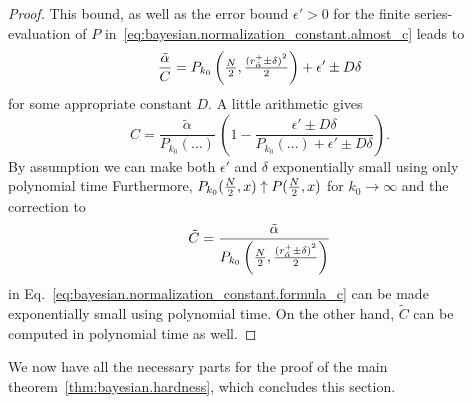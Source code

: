 \begin{proof}
  This bound, as well as the error bound $\epsilon' > 0$ for the finite series-evaluation of $P$ in~\eqref{eq:bayesian.normalization_constant.almost_c} leads to
  \[
    \frac{\tilde\alpha}{C} = P_{k_0}\left( \tfrac{N}{2}, \tfrac{{(r^+_{\tilde\alpha} \pm \delta)}^2}{2} \right) + \epsilon' \pm D \delta
  \]
  for some appropriate constant $D$.
  A little arithmetic gives
  \[
    \label{eq:bayesian.normalization_constant.formula_c}
    C = \frac{\tilde\alpha}{P_{k_0}(\ldots)} \, \left( 1 - \frac{\epsilon' \pm D\delta}{P_{k_0}(\ldots) + \epsilon' \pm D\delta} \right).
  \]
  By assumption we can make both $\epsilon'$ and $\delta$ exponentially small using only polynomial time
  Furthermore, $P_{k_0}(\tfrac{N}{2}, x) \uparrow P(\tfrac{N}{2},x)$ for $k_0 \to \infty$ and the correction to
  \[
    \tilde C = \frac{\tilde\alpha}{P_{k_0}\left( \tfrac{N}{2}, \tfrac{{(r^+_{\tilde\alpha} \pm \delta)}^2}{2} \right)}
  \]
  in Eq.~\eqref{eq:bayesian.normalization_constant.formula_c} can be made exponentially small using polynomial time.
  On the other hand, $\tilde C$ can be computed in polynomial time as well.
\end{proof}

We now have all the necessary parts for the proof of the main theorem~\ref{thm:bayesian.hardness}, which concludes this section.


